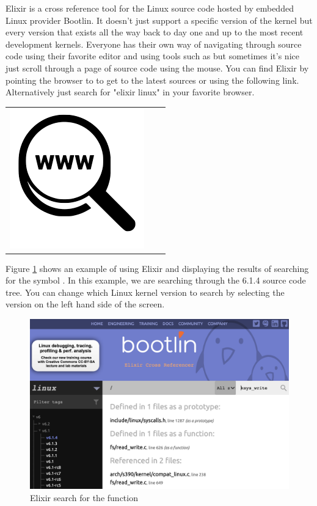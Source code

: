 Elixir is a cross reference tool for the Linux source code hosted by embedded Linux provider Bootlin. It doesn't just support a specific version of the kernel but every version that exists all the way back to day one and up to the most recent development kernels. Everyone has their own way of navigating through source code using their favorite editor and using tools such as  but sometimes it's nice just scroll through a page of source code using the mouse. You can find Elixir by pointing the browser to  to get to the latest sources or using the following link. Alternatively just search for "elixir linux" in your favorite browser.

\begin{table}[h]
\begin{tabular}{lcl}
\parbox[r]{0.5in}{ \includegraphics[scale=0.15]{figures/url.png}} & \parbox[l]{0.1in}{} & \parbox[l]{3in}{}
\end{tabular}
\end{table}

\noindent
Figure \ref{fig:elixr-1} shows an example of using Elixir and displaying the results of searching for the symbol . In this example, we are searching through the 6.1.4 source code tree. You can change which Linux kernel version to search by selecting the version on the left hand side of the screen.

\begin{figure}
	\includegraphics[scale=0.4]{figures/elixr-1.png}
	\centering
	\caption{Elixir search for the function }
	\label{fig:elixr-1}
\end{figure}

